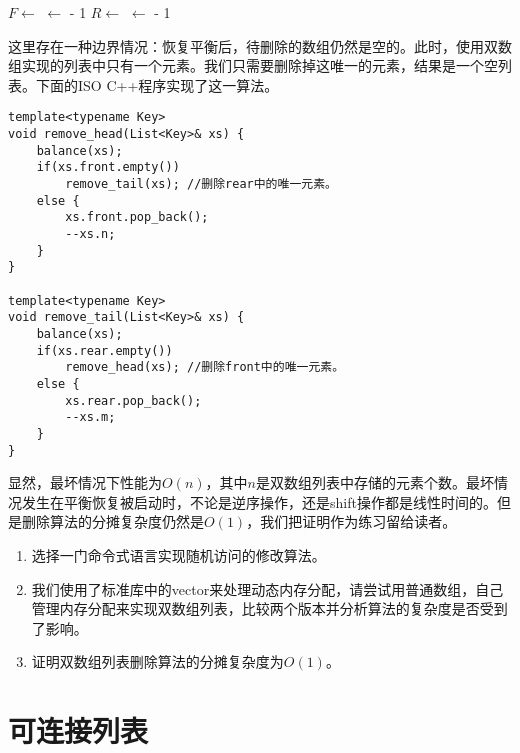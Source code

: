 \documentclass[UTF8]{article}
\begin{document}
\begin{algorithmic}
  \State {}
  \State $F \gets $ 
    \State {}
  \Else
    \State {} $\gets $  - 1
  \EndIf
\EndFunction
\Statex
{}
  \State {}
  \State $R \gets $ 
    \State {}
  \Else
    \State {} $\gets $  - 1
  \EndIf
\EndFunction
\end{algorithmic}

这里存在一种边界情况：恢复平衡后，待删除的数组仍然是空的。此时，使用双数组实现的列表中只有一个元素。我们只需要删除掉这唯一的元素，结果是一个空列表。下面的ISO C++程序实现了这一算法。

\begin{lstlisting}
template<typename Key>
void remove_head(List<Key>& xs) {
    balance(xs);
    if(xs.front.empty())
        remove_tail(xs); //删除rear中的唯一元素。
    else {
        xs.front.pop_back();
        --xs.n;
    }
}

template<typename Key>
void remove_tail(List<Key>& xs) {
    balance(xs);
    if(xs.rear.empty())
        remove_head(xs); //删除front中的唯一元素。
    else {
        xs.rear.pop_back();
        --xs.m;
    }
}
\end{lstlisting}

显然，最坏情况下性能为$O(n)$，其中$n$是双数组列表中存储的元素个数。最坏情况发生在平衡恢复被启动时，不论是逆序操作，还是shift操作都是线性时间的。但是删除算法的分摊复杂度仍然是$O(1)$，我们把证明作为练习留给读者。

\begin{Exercise}
\begin{enumerate}
\item 选择一门命令式语言实现随机访问的修改算法。
\item 我们使用了标准库中的vector来处理动态内存分配，请尝试用普通数组，自己管理内存分配来实现双数组列表，比较两个版本并分析算法的复杂度是否受到了影响。
\item 证明双数组列表删除算法的分摊复杂度为$O(1)$。
\end{enumerate}
\end{Exercise}

\section{可连接列表}
\end{document}
